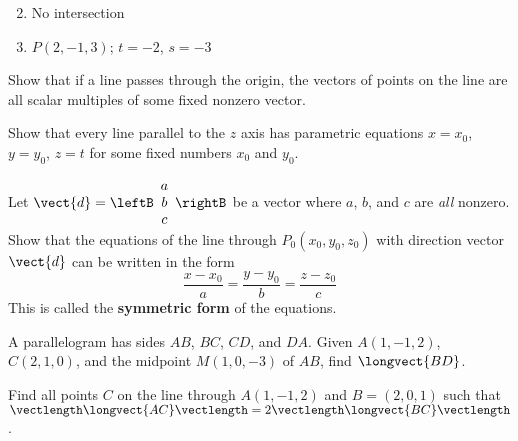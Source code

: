 \begin{multicols}{2}
\begin{ex}
\begin{enumerate}[label={\alph*.}]
\end{enumerate}
\begin{sol}
\begin{enumerate}[label={\alph*.}]
\setcounter{enumi}{1}
\item  No intersection

\setcounter{enumi}{3}
\item  $P(2, -1, 3)$; $t = -2$, $s = -3$

\end{enumerate}
\end{sol}
\end{ex}

\begin{ex}
Show
 that if a line passes through the origin, the vectors of points on the 
line are all scalar multiples of some fixed nonzero vector.
\end{ex}

\begin{ex}
Show that every line parallel to the $z$ axis has parametric equations $x = x_{0}$, $y = y_{0}$, $z = t$ for some fixed numbers $x_{0}$ and $y_{0}$.
\end{ex}

\begin{ex}
Let
$\vect{d} = \leftB
\begin{array}{c}
a\\
b\\
c
\end{array}
\rightB$
 be a vector where $a$, $b$, and $c$ are \textit{all} nonzero. Show that the equations of the line through $P_{0}(x_{0}, y_{0}, z_{0})$ with direction vector $\vect{d}$ can be written in the form
\begin{equation*}
\frac{x - x_{0}}{a} = \frac{y - y_{0}}{b} = \frac{z -z_{0}}{c}
\end{equation*}
This is called the \textbf{symmetric form} of the equations.
\end{ex}

\begin{ex}
A parallelogram has sides $AB$, $BC$, $CD$, and $DA$. Given $A(1, -1, 2)$, $C(2, 1, 0)$, and the midpoint $M(1, 0, -3)$ of $AB$, find $\longvect{BD}$.
\end{ex}

\begin{ex}
Find all points $C$ on the line through $A(1, -1, 2)$ and $B = (2, 0, 1)$ such that $\vectlength \longvect{AC} \vectlength = 2 \vectlength \longvect{BC} \vectlength$.


\end{ex}
\end{multicols}
